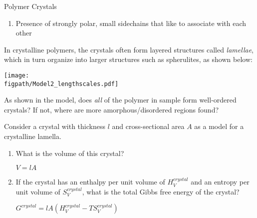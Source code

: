 \begin{activity}{Polymer Crystals}
\begin{ctqs}
\begin{enumerate}
			\item Presence of strongly polar, small sidechains that like to associate with each other
	
		\begin{solution}[0.75in]
		\end{solution}
			
		\end{enumerate}
	
\end{ctqs}

\begin{model}
\label{\labelbase:mdl:thermodynamics}
	
	In crystalline polymers, the crystals often form layered structures called \emph{lamellae}, which in turn organize into larger structures such as spherulites, as shown below:
	
	\vspace{6pt}
	\centerline{\texttt{[image: \\figpath/Model2\_lengthscales.pdf]}}
	
\end{model}

\begin{ctqs}

	\question As shown in the model, does \emph{all} of the polymer in sample form well-ordered crystals?  If not, where are more amorphous/disordered regions found?
	
		\begin{solution}[1in]
		\end{solution}
	
	\question Consider a crystal with thickness $l$ and cross-sectional area $A$ as a model for a crystalline lamella.
	
		\begin{enumerate}
		
			\item What is the volume of this crystal?
			
				\begin{solution}[0.5in]
					$V = lA$
				\end{solution}
			
			\item  If the crystal has an enthalpy per unit volume of $H^{crystal}_V$ and an entropy per unit volume of $ S^{crystal}_V$, what is the total Gibbs free energy of the crystal?
			
				\begin{solution}[0.5in]
					$G^{crystal} = lA(  H^{crystal}_V - T S^{crystal}_V )$
				\end{solution}
			

\end{enumerate}
\end{ctqs}
\end{activity}
